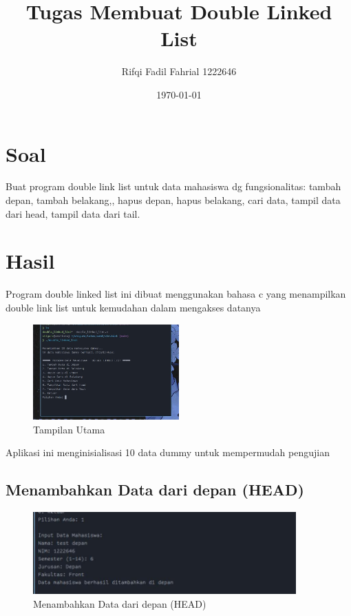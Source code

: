 \documentclass{article}
\title{Tugas Membuat Double Linked List}
\author{Rifqi Fadil Fahrial 1222646}
\date{\today}
\begin{document}
\maketitle

\section{Soal}
Buat program double link list untuk data mahasiswa dg fungsionalitas:  tambah
depan, tambah belakang,, hapus depan, hapus belakang, cari data, tampil data
dari head, tampil data dari tail.

\section{Hasil}
Program double linked list ini dibuat menggunakan bahasa c yang menampilkan
double link list untuk kemudahan dalam mengakses datanya
\begin{figure}[H]
\centering
\includegraphics[width=0.5\textwidth]{images/gambar1.jpg}
\caption{Tampilan Utama}
\label{fig:sample-image}
\end{figure}

Aplikasi ini menginisialisasi 10 data dummy untuk mempermudah pengujian

\subsection{Menambahkan Data dari depan (HEAD)}

\begin{figure}[H]
\centering
\includegraphics[width=0.9\textwidth]{images/gambar2.jpg}
\caption{Menambahkan Data dari depan (HEAD)}
\label{fig:sample-image}
\end{figure}
\end{document}
